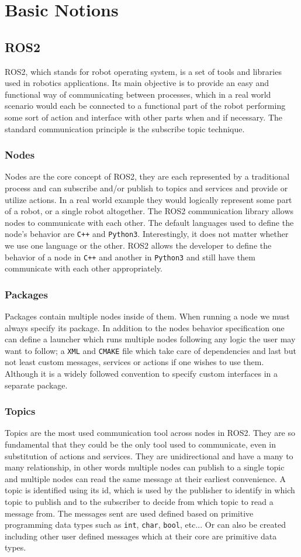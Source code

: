 \chapter{Basic Notions}
\section{ROS2}
ROS2, which stands for robot operating system, is a set of tools and libraries used in robotics applications. Its main objective is to provide an easy and functional way of communicating between processes, which in a real world scenario would each be connected to a functional part of the robot performing some sort of action and interface with other parts when and if necessary. The standard communication principle is the subscribe topic technique.
\subsection{Nodes}
Nodes are the core concept of ROS2, they are each represented by a traditional process and can subscribe and/or publish to topics and services and provide or utilize actions. In a real world example they would logically represent some part of a robot, or a single robot altogether. The ROS2 communication library allows nodes to communicate with each other. The default languages used to define the node's behavior are \texttt{C++} and \texttt{Python3}. Interestingly, it does not matter whether we use one language or the other. ROS2 allows the developer to define the behavior of a node in \texttt{C++} and another in \texttt{Python3} and still have them communicate with each other appropriately.
\subsection{Packages}
Packages contain multiple nodes inside of them. When running a node we must always specify its package. In addition to the nodes behavior specification one can define a launcher which runs multiple nodes following any logic the user may want to follow; a \texttt{XML} and \texttt{CMAKE} file which take care of dependencies and last but not least custom messages, services or actions if one wishes to use them. Although it is a widely followed convention to specify custom interfaces in a separate package.
\subsection{Topics}
Topics are the most used communication tool across nodes in ROS2. They are so fundamental that they could be the only tool used to communicate, even in substitution of actions and services. They are unidirectional and have a many to many relationship, in other words multiple nodes can publish to a single topic and multiple nodes can read the same message at their earliest convenience. A topic is identified using its id, which is used by the publisher to identify in which topic to publish and to the subscriber to decide from which topic to read a message from. The messages sent are used defined based on primitive programming data types such as \texttt{int}, \texttt{char}, \texttt{bool}, etc... Or can also be created including other user defined messages which at their core are primitive data types.   
